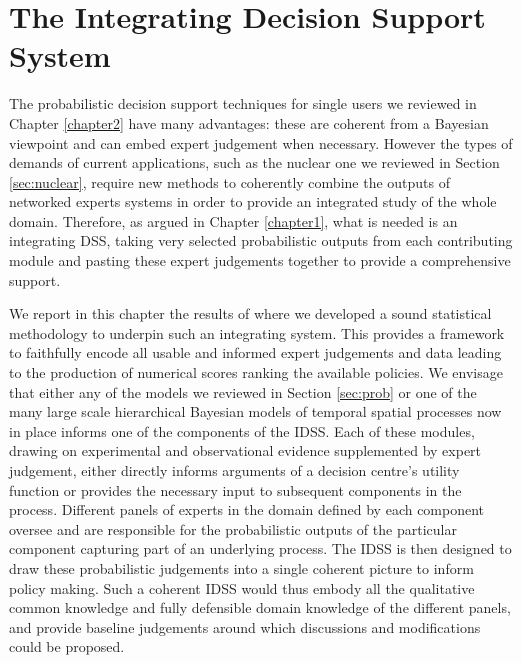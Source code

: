 
\chapter{The Integrating Decision Support System} %

\label{chapter3} %


The probabilistic decision support techniques for single users we reviewed in Chapter \ref{chapter2} have many advantages: these are coherent from a Bayesian viewpoint and can embed expert judgement when necessary. However the types of demands of current applications, such as the nuclear one we reviewed in Section \ref{sec:nuclear}, require new methods to coherently combine the outputs of networked experts systems in order to provide an integrated study of the whole domain. Therefore, as argued in Chapter \ref{chapter1}, what is needed is an integrating DSS, taking very selected probabilistic outputs from each contributing module and pasting these expert judgements together to provide a comprehensive support. 

We report in this chapter the results of \citet{Smith2015} where we developed a sound statistical methodology to underpin such an integrating system. This provides a framework to faithfully encode all usable and informed expert judgements and data leading to the production of numerical scores ranking the available policies. We envisage that either any of the models we reviewed in Section \ref{sec:prob} or one of the many large
scale hierarchical Bayesian models of temporal spatial processes now in place \citep[e.g.][]{Best2005,Jewell2009, McKinley2014, Wikle2001} informs one of the components of the IDSS. Each of these modules, drawing on experimental and observational evidence supplemented by expert judgement, either directly informs arguments of a decision centre's utility function or provides the necessary input to subsequent components in the process. Different panels of experts in the domain defined by each component oversee and are responsible for the probabilistic outputs of the particular component capturing part of an underlying process. The IDSS is then designed to draw these probabilistic judgements into a single coherent picture to inform policy making. Such a coherent IDSS would thus embody all the qualitative common knowledge and fully defensible domain knowledge of the different panels, and provide baseline judgements around which discussions and modifications could be proposed. 

